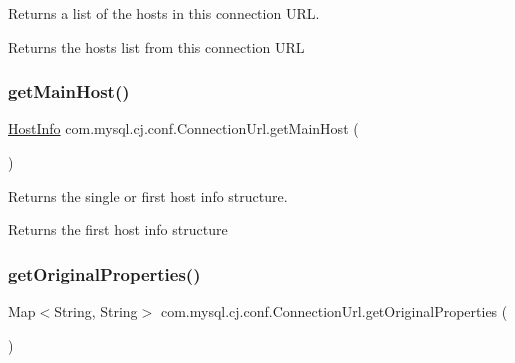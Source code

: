 Returns a list of the hosts in this connection U\+RL.

\begin{DoxyReturn}{Returns}
the hosts list from this connection U\+RL 
\end{DoxyReturn}
\mbox{\label{classcom_1_1mysql_1_1cj_1_1conf_1_1_connection_url_a97fd0f7c1fa6ffdc8cb195f58b4b5ca1}} 
\subsubsection{\texorpdfstring{get\+Main\+Host()}{getMainHost()}}
{\footnotesize\ttfamily \mbox{\hyperlink{classcom_1_1mysql_1_1cj_1_1conf_1_1_host_info}{Host\+Info}} com.\+mysql.\+cj.\+conf.\+Connection\+Url.\+get\+Main\+Host (\begin{DoxyParamCaption}{ }\end{DoxyParamCaption})}

Returns the single or first host info structure.

\begin{DoxyReturn}{Returns}
the first host info structure 
\end{DoxyReturn}
\mbox{\label{classcom_1_1mysql_1_1cj_1_1conf_1_1_connection_url_a9d7c5ace6030f70b633a6f8505bca69b}} 
\subsubsection{\texorpdfstring{get\+Original\+Properties()}{getOriginalProperties()}}
{\footnotesize\ttfamily Map$<$String, String$>$ com.\+mysql.\+cj.\+conf.\+Connection\+Url.\+get\+Original\+Properties (\begin{DoxyParamCaption}{ }\end{DoxyParamCaption})}

